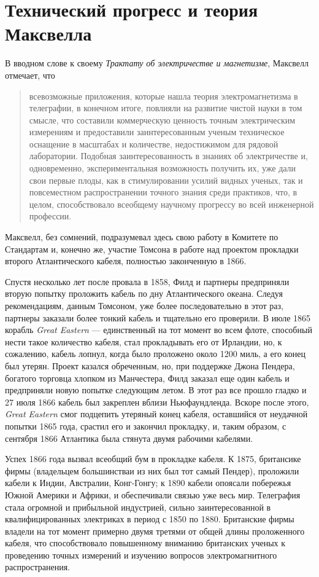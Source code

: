 \documentclass[12pt, oneside, a4paper]{article}
\begin{document}
\section*{Технический прогресс и теория Максвелла}
В вводном слове к своему \emph{Трактату об электричестве и магнетизме}, Максвелл отмечает, что 
\begin{quote}
\small
всевозможные приложения, которые нашла теория электромагнетизма в телеграфии, в конечном итоге, повлияли на развитие чистой науки в том смысле, что составили коммерческую ценность точным электрическим измерениям и предоставили заинтересованным ученым техническое оснащение в масштабах и количестве, недостижимом для рядовой лаборатории. Подобная заинтересованность в знаниях об электричестве и, одновременно, экспериментальная возможность получить их, уже дали свои первые плоды, как в стимулировании усилий видных ученых, так и повсеместном распространении точного знания среди практиков, что, в целом, способствовало  всеобщему научному прогрессу во всей инженерной профессии.
\end{quote}
Максвелл, без сомнений, подразумевал здесь свою работу в Комитете по Стандартам и, конечно же, участие Томсона в работе над проектом прокладки второго Атлантического кабеля, полностью законченную в 1866.

Спустя несколько лет после провала в 1858, Филд и партнеры предприняли вторую попытку проложить кабель по дну Атлантического океана. Следуя рекомендациям, данным Томсоном, уже более последовательно в этот раз, партнеры заказали более тонкий кабель и тщательно его проверили. В июле 1865 корабль \emph{Great Eastern} --- единственный на тот момент во всем флоте, способный нести такое количество кабеля, стал прокладывать его от Ирландии, но, к сожалению, кабель лопнул, когда было проложено около 1200 миль, а его конец был утерян. Проект казался обреченным, но, при поддержке Джона Пендера, богатого торговца хлопком из Манчестера, Филд заказал еще один кабель и предприняли новую попытке следующим летом. В этот раз все прошло гладко и 27 июля 1866 кабель был закреплен вблизи Ньюфаундленда. Вскоре после этого, \emph{Great Eastern} смог подцепить утеряный конец кабеля, оставшийся от неудачной попытки 1865 года, срастил его и закончил прокладку, и, таким образом, с сентября 1866 Атлантика была стянута двумя рабочими кабелями.

Успех 1866 года вызвал всеобщий бум в прокладке кабеля. К 1875, британсике фирмы (владельцем большинстваи из них был тот самый Пендер), проложили кабели к Индии, Австралии, Конг-Гонгу; к 1890 кабели опоясали побережья Южной Америки и Африки, и обеспечивали связью уже весь мир. Телеграфия стала огромной и прибыльной индустрией, сильно заинтересованной в квалифицированных электриках в период с 1850 по 1880. Британские фирмы владели на тот момент примерно двумя третями от общей длины проложенного кабеля, что способствовало повышенному вниманию британских ученых к проведению точных измерений и изучению вопросов электромагнитного распространения.
\end{document}
